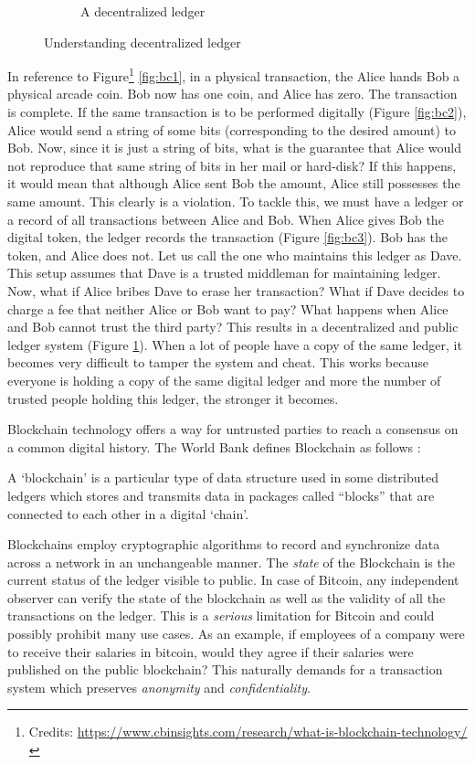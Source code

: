 \begin{figure}[h!]
\begin{subfigure}[b]{0.7\textwidth}
        \caption{A decentralized ledger}
        \label{fig:bc4}
    \end{subfigure}
    \caption{Understanding decentralized ledger}
    \label{fig:bc}
\end{figure}

In reference to Figure\footnote{Credits: \url{https://www.cbinsights.com/research/what-is-blockchain-technology/}}
\ref{fig:bc1}, in a physical transaction, the Alice hands Bob a physical arcade coin. Bob now has one coin, and Alice has zero. The transaction is complete. 
If the same transaction is to be performed digitally (Figure \ref{fig:bc2}), Alice would send a string of some bits (corresponding to the desired amount) to Bob. 
Now, since it is just a string of bits, what is the guarantee that Alice would not reproduce that same string of bits in her mail or hard-disk?
If this happens, it would mean that although Alice sent Bob the amount, Alice still possesses the same amount. 
This clearly is a violation.
To tackle this, we must have a ledger or a record of all transactions between Alice and Bob. 
When Alice gives Bob the digital token, the ledger records the transaction (Figure \ref{fig:bc3}). 
Bob has the token, and Alice does not. Let us call the one who maintains this ledger as Dave.
This setup assumes that Dave is a trusted middleman for maintaining ledger. 
Now, what if Alice bribes Dave to erase her transaction? What if Dave decides to charge a fee that neither Alice or Bob want to pay? 
What happens when Alice and Bob cannot trust the third party? This results in a decentralized and public ledger system (Figure \ref{fig:bc4}). 
When a lot of people have a copy of the same ledger, it becomes very difficult to tamper the system and cheat. 
This works because everyone is holding a copy of the same digital ledger and more the number of trusted people holding this ledger, the stronger it becomes.


Blockchain technology offers a way for untrusted parties to reach a consensus on a common digital history. The World Bank defines Blockchain as follows \cite{natar17}:

\begin{definition}[Blockchain]
    A `blockchain' is a particular type of data structure used in some distributed ledgers
    which stores and transmits data in packages called ``blocks'' that are connected to each
    other in a digital `chain'. 
\end{definition}

Blockchains employ cryptographic algorithms to record and synchronize data across a network in an unchangeable manner. The \textit{state} of the Blockchain is the current status of the ledger visible to public. 
In case of Bitcoin, any independent observer can verify the state of the blockchain as well as the validity of all the transactions on the ledger.
This is a \textit{serious} limitation for Bitcoin and could possibly prohibit many use cases.
As an example, if employees of a company were to receive their salaries in bitcoin, would they agree if their salaries were published on the public blockchain? 
This naturally demands for a transaction system which preserves \textit{anonymity} and \textit{confidentiality}.


